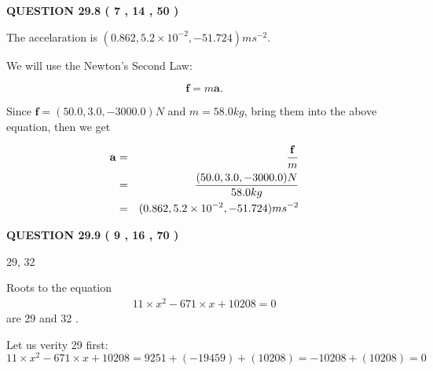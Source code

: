 \documentclass[12pt]{article}
\begin{document}
 
 
  
\vspace{0.2in}
  
{\textbf{\Large{QUESTION
29.8 
 (           7 ,          14 ,          50 )
}}}
  
  
 
 
\noindent{}
 
 
  The accelaration is $  %
(
0.862,
5.2 \times 10^{-2},
-51.724)
ms^{-2} $.
 
 
 
 
 
 
\noindent{}

We will use the Newton's Second Law:
 
\[
\mathbf{f}=m\mathbf{a}.
\]
 
Since $\mathbf{f}= %
(50.0 , 3.0 , -3000.0) N$
and $m= %
58.0kg$, bring them into the above equation, then we get
 
\begin{eqnarray*}
\mathbf{a}&=&\frac{\mathbf{f}}m  \\
&=&\frac{ %
(50.0 , 3.0 , -3000.0) N}{ %
58.0kg}  \\
&=& %
(0.862 , 5.2 \times 10^{-2} , -51.724) ms^{-2}
\end{eqnarray*}
 
 
 
  
\vspace{0.2in}
  
{\textbf{\Large{QUESTION
29.9 
 (           9 ,          16 ,          70 )
}}}
  
  


 
 
\noindent{}

29,  %
32
 
 
 
 
 
\noindent{}

Roots to the equation
\begin{eqnarray*}
11 \times x^2  %
-671
                 \times x    %
+  %
10208 =0
\end{eqnarray*}
are  %
29 and  %
32 .
 
Let us verity  %
29 first:
$  %
11 \times x^2  %
-671
                 \times x    %
+  %
10208
  = %
9251+( %
-19459)+( %
10208)
  = %
-10208+( %
10208)
  = %
0
$
 
\end{document}
